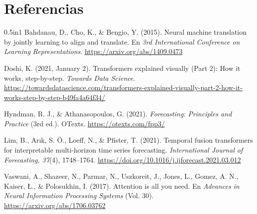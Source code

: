 \documentclass[12pt]{article}
\begin{document}
\section*{Referencias}
\begin{hangparas}{0.5in}{1}
Bahdanau, D., Cho, K., \& Bengio, Y. (2015). Neural machine translation by jointly learning to align and translate. En \textit{3rd International Conference on Learning Representations}. \url{https://arxiv.org/abs/1409.0473}

Doshi, K. (2021, January 2). Transformers explained visually (Part 2): How it works, step-by-step. \textit{Towards Data Science}. \url{https://towardsdatascience.com/transformers-explained-visually-part-2-how-it-works-step-by-step-b49fa4a64f34/}

Hyndman, R. J., \& Athanasopoulos, G. (2021). \textit{Forecasting: Principles and Practice} (3rd ed.). OTexts. \url{https://otexts.com/fpp3/}

Lim, B., Arık, S. Ö., Loeff, N., \& Pfister, T. (2021). Temporal fusion transformers for interpretable multi-horizon time series forecasting. \textit{International Journal of Forecasting, 37}(4), 1748--1764. \url{https://doi.org/10.1016/j.ijforecast.2021.03.012}

Vaswani, A., Shazeer, N., Parmar, N., Uszkoreit, J., Jones, L., Gomez, A. N., Kaiser, Ł., \& Polosukhin, I. (2017). Attention is all you need. En \textit{Advances in Neural Information Processing Systems} (Vol. 30). \url{https://arxiv.org/abs/1706.03762}
\end{hangparas}
\end{document}
